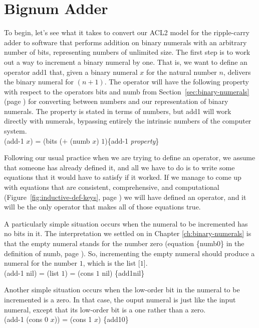 \section{Bignum Adder}
\label{sec:bignum-adder}

To begin, let's see what it takes to convert our ACL2 model for
the ripple-carry adder to software that performs addition on
binary numerals with an arbitrary number of bits,
representing numbers of unlimited size.
The first step is to work out a way to increment a
binary numeral by one. 
That is,
we want to define an operator add1 that, given a
binary numeral $x$ for the natural number $n$, delivers the
binary numeral for $(n+1)$. 
The operator will have the following
property with respect to the operators bits and numb from
Section~\ref{sec:binary-numerals} (page \pageref{bits-defun})
for converting between numbers and our representation
of binary numerals. The property is stated in terms of numbers,
but add1 will work directly with numerals, 
bypassing entirely the intrinsic numbers of the computer system.
\\
\vspace{2mm}
\hspace*{2cm}
(add-1 $x$) = (bits ($+$ (numb $x$) $1$)\hfill\{add-1 \emph{property}\}

Following our usual practice when we are trying to define an operator,
we assume that someone has already defined it,
and all we have to do is to write some equations that it
would have to satisfy if it worked. If we manage
to come up with equations that are consistent, comprehensive, and computational
(Figure~\ref{fig:inductive-def-keys}, page \pageref{fig:inductive-def-keys})
we will have defined an operator, 
and it will be the only operator that makes all of those equations true.

A particularly simple situation occurs when the numeral to be incremented
has no bits in it. The interpretation we settled on
in Chapter \ref{ch:binary-numerals} is that
the empty numeral stands for the number zero
(equation \{numb0\} in the definition of numb, page \pageref{nmb-defun}).
So, incrementing the empty numeral should produce a numeral for the number $1$,
which is the list [$1$].
\\
\vspace{2mm}
\hspace*{2cm}
(add-1 nil) = (list $1$) = (cons $1$ nil)  \hfill \{add1nil\}

Another simple situation occurs when the low-order bit in the
numeral to be incremented is a zero.
In that case, the ouput numeral is
just like the input numeral, except that its
low-order bit is a one rather than a zero.
\\
\vspace{2mm}
\hspace*{2cm}
(add-1 (cons 0 $x$)) = (cons 1 $x$)    \hfill \{add10\}

